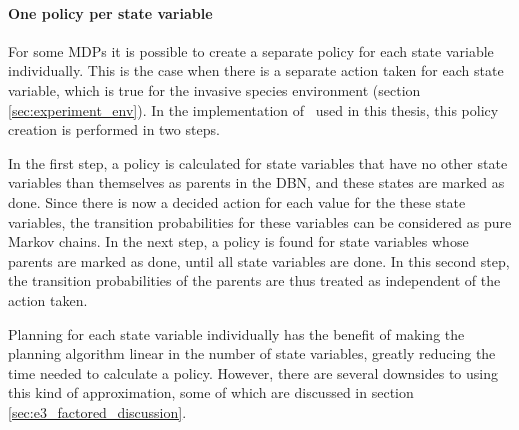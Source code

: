 \paragraph{One policy per state variable}
\label{sec:one_policy_per_state_variable}

For some MDPs it is possible to create a separate policy for each state
variable individually. This is the case when there is a separate action taken
for each state variable, which is true for the invasive species environment
(section \ref{sec:experiment_env}). In the implementation of \etre\ used in
this thesis, this policy creation is performed in two steps. 

In the first step, a policy is calculated for state variables that have no
other state variables than themselves as parents in the DBN, and these states
are marked as done. Since there is now a decided action for each value for the
these state variables, the transition probabilities for these variables can be
considered as pure Markov chains. In the next step, a policy is found for state
variables whose parents are marked as done, until all state variables are done.
In this second step, the transition probabilities of the parents are thus
treated as independent of the action taken.

Planning for each state variable individually has the benefit of making the
planning algorithm linear in the number of state variables, greatly reducing
the time needed to calculate a policy. However, there are several downsides to
using this kind of approximation, some of which are discussed in section
\ref{sec:e3_factored_discussion}.
